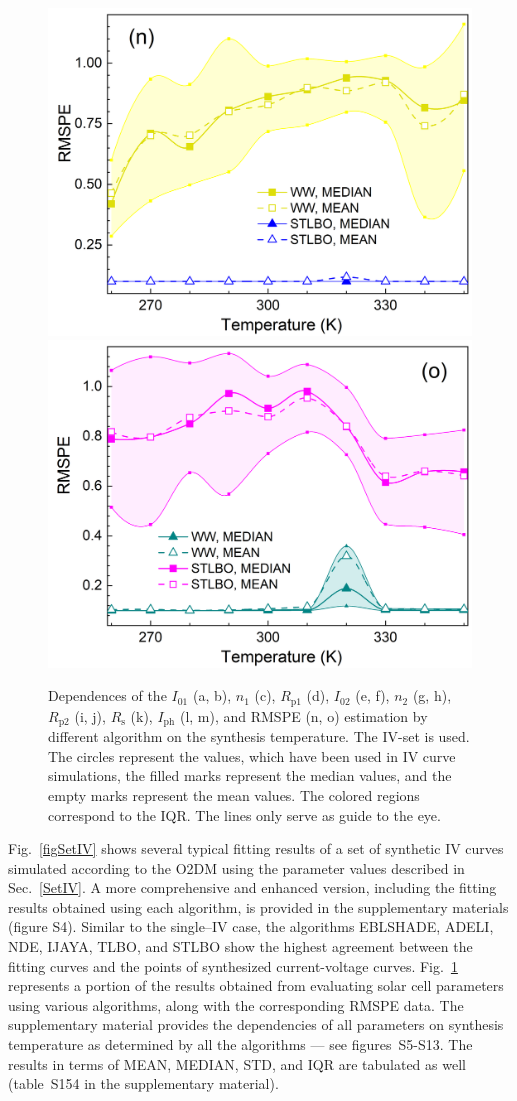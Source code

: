 \documentclass[a4paper,fleqn]{cas-dc}
\begin{document}
\begin{figure}[]
        \includegraphics[width=.32\textwidth]{AfigN}
        \includegraphics[width=.32\textwidth]{AfigO}
	  \caption{Dependences of the $I_{01}$ (a, b), $n_1$ (c), $R_\mathrm{p1}$ (d), $I_{02}$ (e, f),
               $n_2$ (g, h), $R_\mathrm{p2}$ (i, j), $R_\mathrm{s}$ (k), $I_\mathrm{ph}$ (l, m), and RMSPE (n, o)
               estimation by different algorithm on the synthesis temperature.
               The IV-set is used.
               The circles represent the values, which have been used in IV curve simulations,
               the filled marks represent the median values, and the empty marks represent the mean values.
               The colored regions correspond to the IQR.
               The lines only serve as guide to the eye.
               }\label{figTDepIVset}
\end{figure}

Fig.~\ref{figSetIV} shows several typical fitting results of a set of synthetic IV curves
simulated according to the O2DM using the parameter values described in Sec.~\ref{SetIV}.
A more comprehensive and enhanced version, including the fitting results obtained using each algorithm,
is provided in the supplementary materials (figure S4).
Similar to the single--IV case,
the algorithms EBLSHADE, ADELI, NDE, IJAYA, TLBO, and STLBO show
the highest agreement between the fitting curves and the points of synthesized current-voltage curves.
Fig.~\ref{figTDepIVset} represents a portion of the results obtained from evaluating solar cell parameters using various algorithms,
along with the corresponding RMSPE data.
The supplementary material provides the dependencies of all parameters on synthesis temperature
as determined by all the algorithms --- see figures~S5-S13.
The results in terms of MEAN, MEDIAN, STD, and IQR are tabulated as well (table~S154 in the supplementary material).
\end{document}
